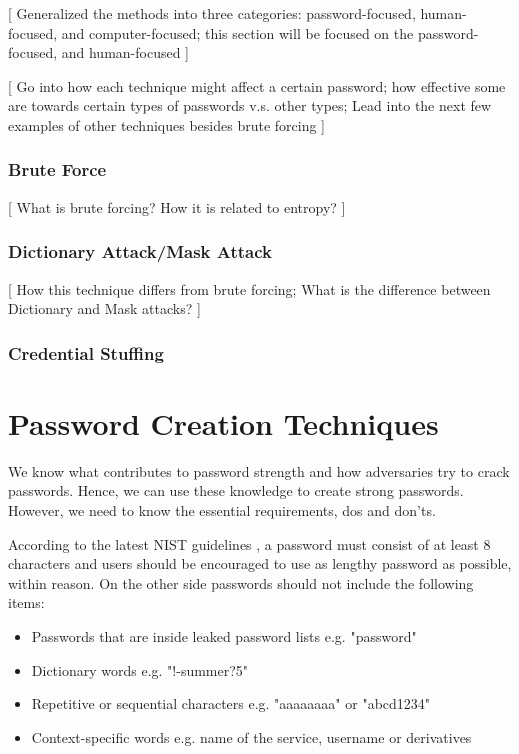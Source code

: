\documentclass[acmsmall,nonacm]{acmart}
\begin{document}
\textcolor{beaver}{[ Generalized the methods into three categories: password-focused, human-focused, and computer-focused; this section will be focused on the password-focused, and human-focused ]}


\textcolor{beaver}{[ Go into how each technique might affect a certain password; how effective some are towards certain types of passwords v.s. other types; Lead into the next few examples of other techniques besides brute forcing ]}

\subsubsection{Brute Force}

\textcolor{beaver}{[ What is brute forcing? How it is related to entropy? ]}
\cite{pedamkar_2021}

\subsubsection{Dictionary Attack/Mask Attack}
\textcolor{beaver}{[ How this technique differs from brute forcing; What is the difference between Dictionary and Mask attacks? ]}
\cite{contributor_2005}
\cite{hashcat}

\subsubsection{Credential Stuffing}
\cite{mueller_wetter_manico_kingthorin}
\cite{imperva_2020}


\section{Password Creation Techniques} \label{creation}

We know what contributes to password strength  and how adversaries try to crack passwords. Hence, we can use these knowledge to create strong passwords. However, we need to know the essential requirements, dos and don'ts.

According to the latest NIST guidelines \cite{nist_2020}, a password must consist of at least 8 characters and users should be encouraged to use as lengthy password as possible, within reason. On the other side passwords should not include the following items:

\begin{itemize}
\item Passwords that are inside leaked password lists e.g. "password" 
\item Dictionary words e.g. "!-summer?5"
\item Repetitive or sequential characters e.g. "aaaaaaaa" or "abcd1234"
\item Context-specific words e.g. name of the service, username or derivatives
\end{itemize}
\end{document}
